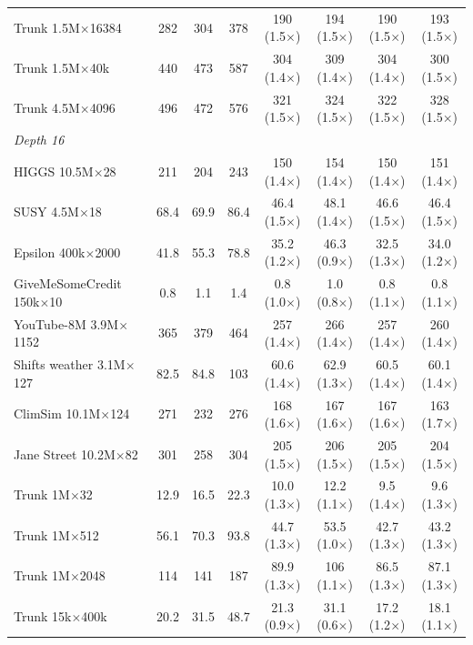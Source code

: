 \begin{table}[p]
\begin{tabular}{l|ccc|cccc}
        Trunk 1.5M$\times$16384 & 282 & 304 & 378 & 190 (1.5$\times$) & 194 (1.5$\times$) & 190 (1.5$\times$) & 193 (1.5$\times$) \\
        Trunk 1.5M$\times$40k & 440 & 473 & 587 & 304 (1.4$\times$) & 309 (1.4$\times$) & 304 (1.4$\times$) & 300 (1.5$\times$) \\
        Trunk 4.5M$\times$4096 & 496 & 472 & 576 & 321 (1.5$\times$) & 324 (1.5$\times$) & 322 (1.5$\times$) & 328 (1.5$\times$) \\
        \hline
        \multicolumn{8}{l}{\textit{Depth 16}} \\
        HIGGS 10.5M$\times$28 & 211 & 204 & 243 & 150 (1.4$\times$) & 154 (1.4$\times$) & 150 (1.4$\times$) & 151 (1.4$\times$) \\
        SUSY 4.5M$\times$18 & 68.4 & 69.9 & 86.4 & 46.4 (1.5$\times$) & 48.1 (1.4$\times$) & 46.6 (1.5$\times$) & 46.4 (1.5$\times$) \\
        Epsilon 400k$\times$2000 & 41.8 & 55.3 & 78.8 & 35.2 (1.2$\times$) & 46.3 (0.9$\times$) & 32.5 (1.3$\times$) & 34.0 (1.2$\times$) \\
        GiveMeSomeCredit 150k$\times$10 & 0.8 & 1.1 & 1.4 & 0.8 (1.0$\times$) & 1.0 (0.8$\times$) & 0.8 (1.1$\times$) & 0.8 (1.1$\times$) \\
        YouTube-8M 3.9M$\times$1152 & 365 & 379 & 464 & 257 (1.4$\times$) & 266 (1.4$\times$) & 257 (1.4$\times$) & 260 (1.4$\times$) \\
        Shifts weather 3.1M$\times$127 & 82.5 & 84.8 & 103 & 60.6 (1.4$\times$) & 62.9 (1.3$\times$) & 60.5 (1.4$\times$) & 60.1 (1.4$\times$) \\
        ClimSim 10.1M$\times$124 & 271 & 232 & 276 & 168 (1.6$\times$) & 167 (1.6$\times$) & 167 (1.6$\times$) & 163 (1.7$\times$) \\
        Jane Street 10.2M$\times$82 & 301 & 258 & 304 & 205 (1.5$\times$) & 206 (1.5$\times$) & 205 (1.5$\times$) & 204 (1.5$\times$) \\
        Trunk 1M$\times$32 & 12.9 & 16.5 & 22.3 & 10.0 (1.3$\times$) & 12.2 (1.1$\times$) & 9.5 (1.4$\times$) & 9.6 (1.3$\times$) \\
        Trunk 1M$\times$512 & 56.1 & 70.3 & 93.8 & 44.7 (1.3$\times$) & 53.5 (1.0$\times$) & 42.7 (1.3$\times$) & 43.2 (1.3$\times$) \\
        Trunk 1M$\times$2048 & 114 & 141 & 187 & 89.9 (1.3$\times$) & 106 (1.1$\times$) & 86.5 (1.3$\times$) & 87.1 (1.3$\times$) \\
        Trunk 15k$\times$400k & 20.2 & 31.5 & 48.7 & 21.3 (0.9$\times$) & 31.1 (0.6$\times$) & 17.2 (1.2$\times$) & 18.1 (1.1$\times$) \\

\end{tabular}
\end{table}
